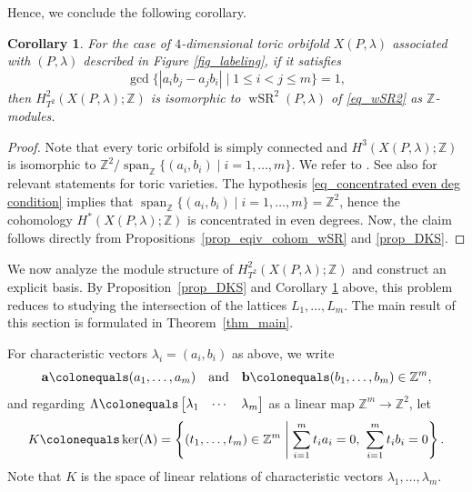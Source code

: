 \documentclass[10pt]{amsart}
\theoremstyle{plain}
\newtheorem{corollary}[theorem]{Corollary}
\theoremstyle{definition}
\numberwithin{equation}{section}
\newcommand{\ZZ}{\mathbb{Z}}
\DeclareMathOperator{\wSR}{wSR}
\DeclareMathOperator{\spa}{span}
\begin{document}
Hence, we conclude the following corollary. 
\begin{corollary}\label{cor_KMZ}
For the case of $4$-dimensional toric orbifold $X(P, \lambda)$ associated with $(P, \lambda)$ described in Figure \ref{fig_labeling}, if it satisfies
\begin{equation}\label{eq_concentrated even deg condition}
\gcd\{ |a_ib_j-a_jb_i| \mid 1\leq i<j\leq m\}=1,
\end{equation}
then $H^2_{T^2}(X(P,\lambda);\ZZ)$ is isomorphic to $\wSR^2(P, \lambda)$ of \eqref{eq_wSR2} as $\ZZ$-modules. 
\end{corollary}
\begin{proof}
Note that every toric orbifold is simply connected and $H^3(X(P, \lambda);\ZZ)$ is isomorphic to $\ZZ^2/\spa_\ZZ \{(a_i, b_i)\mid i=1, \dots, m\}$. We refer to \cite{KMZ}. See also \cite{Jor, Fis} for relevant statements for toric varieties. The hypothesis \eqref{eq_concentrated even deg condition}
implies that  $\spa_\ZZ\{(a_i, b_i)\mid i=1, \dots, m\}=\ZZ^2$, hence the cohomology $H^\ast(X(P, \lambda);\ZZ)$ is concentrated in even degrees. Now, the claim follows directly from Propositions~\ref{prop_eqiv_cohom_wSR} and \ref{prop_DKS}. 
\end{proof}


We now analyze the module structure of $H^2_{T^2}(X(P,\lambda);\ZZ)$ and construct an explicit basis. By Proposition~\ref{prop_DKS} and 
Corollary \ref{cor_KMZ} above, this problem reduces to studying the intersection of the lattices $L_1,\dots,L_m$. The main result of this section is formulated in Theorem~\ref{thm_main}.


For characteristic vectors $\lambda_i=(a_i, b_i)$  as above, we write 
\begin{equation}\label{eq_a_b}
\mathbf{a}\colonequals (a_1,\dots,a_m)\quad \text{and} \quad \mathbf{b}\colonequals (b_1,\dots,b_m)\in \mathbb{Z}^m,
\end{equation}
and regarding $\Lambda\colonequals \begin{bmatrix} \lambda_1 & \cdots & \lambda_m \end{bmatrix}$ as a linear map $\ZZ^m \to \ZZ^2$, let 
\begin{equation}\label{eq_K}
K\colonequals \ker(\Lambda)
=
\left\{
(t_1,\dots,t_m)\in \mathbb{Z}^m \;\middle|\;
\sum_{i=1}^m t_i a_i=0,\ \sum_{i=1}^m t_i b_i=0
\right\}.
\end{equation}
Note that $K$ is the space of linear relations of characteristic vectors $\lambda_1, \dots, \lambda_m$. 
\end{document}
